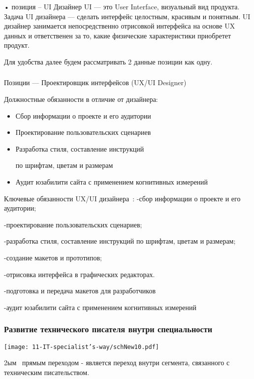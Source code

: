 \documentclass{../industrial-development}
\begin{document}
•	позиция – UI Дизайнер
UI — это User Interface, визуальный вид продукта. Задача UI дизайнера — сделать интерфейс целостным, красивым и понятным. UI дизайнер занимается непосредственно отрисовкой интерфейса на основе UX данных и ответственен за то, какие физические характеристики приобретет продукт.

Для удобства далее будем рассматривать 2 данные позиции как одну.

\begin{frame} \frametitle{}
 \begin{block}{}
  \alert{Позиции --- Проектировщик интерфейсов (UX/UI Designer)}

Должностные обязанности в отличие от дизайнера: 
  \end{block}
  \begin{itemize}
  \item Сбор информации о проекте и его аудитории
  \item Проектирование пользовательских сценариев
  \item Разработка стиля, составление инструкций 

по шрифтам, цветам и размерам
 \item Аудит юзабилити сайта с применением когнитивных измерений
  \end{itemize}
\end{frame}

\lecturenotes

Ключевые обязанности UX/UI дизайнера~\cite{rab}:
-сбор информации о проекте и его аудитории;

-проектирование пользовательских сценариев;

-разработка стиля, составление инструкций по шрифтам, цветам и размерам;

-создание макетов и прототипов;

-отрисовка интерфейса в графических редакторах.

-подготовка и передача макетов для разработчиков

-аудит юзабилити сайта с применением когнитивных измерений


\begin{frame} \frametitle{Развитие технического писателя внутри специальности}
  \centerline{\texttt{[image: 11-IT-specialist's-way/schNew10.pdf]}}
\end{frame}

\lecturenotes

 2ым~\cite{mc} прямым переходом  - является переход внутри сегмента, связанного с техническим писательством.
\end{document}
